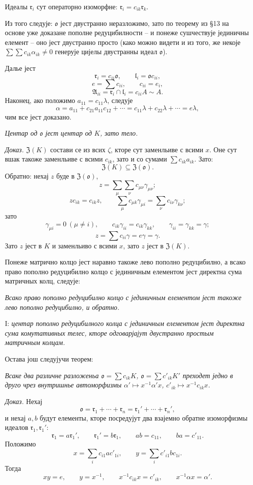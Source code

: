 ﻿\documentclass[11pt]{article}
\providecommand{\mA}{\mathfrak{A}}
\providecommand{\ml}{\mathfrak{l}}
\providecommand{\mo}{\mathfrak{o}}
\providecommand{\mr}{\mathfrak{r}}
\providecommand{\mZ}{\mathfrak{Z}}
\begin{document}
Идеалы $\mr_i$ сут операторно изоморфне: $\mr_i=c_{ik}\mr_k$.

Из того следује: $\mo$ јест двустранно неразложимо, зато по теорему из §13 на основе уже доказане пополне редуцибилности -- и понеже сушчествује јединичны елемент -- оно јест двустранно просто (како можно видети и из того, же некоје $\sum\sum c_{ik}\alpha_{ik}\ne0$ генерује цијелы двустранны идеал $\mo$).

Далье јест
\[
        \mr_i=c_{ii}\mo,
        \qquad
        \ml_i=\mo c_{ii},
\]
\[
        e=\sum c_{ii},
        \qquad c_{ii}=e_i,
\]
\[
        \mA_{ii}=\mr_i\cap\ml_i=c_{ii}A\sim A.
\]
Наконец, ако положимо $a_{11}=c_{11}\lambda$, следује
\[
        \alpha=a_{11}+c_{21}a_{11}c_{12}+\cdots
        =c_{11}\lambda+c_{22}\lambda+\cdots=e\lambda,
\]
чим все јест доказано.

\emph{Центар од $\mo$ јест центар од $K$, зато тело.}

\emph{Доказ.} $\mZ(K)$ состави се из всих $\zeta$, кторе сут заменльиве с всими $x$. Оне сут вшак такоже заменльиве с всими $c_{ik}$, зато и со сумами $\sum c_{ik}a_{ik}$. Зато:
\[
        \mZ(K)\subseteq\mZ(\mo).
\]
Обратно: нехај $z$ буде в $\mZ(\mo)$,
\[
        z=\sum_\mu\sum_\nu c_{\mu\nu}\gamma_{\mu\nu};
\]
\[
        zc_{ik}=c_{ik}z,
        \qquad
        \sum_\mu c_{\mu k}\gamma_{\mu i}=\sum_\nu c_{i\nu}\gamma_{k\nu};
\]
зато
\[
        \gamma_{\mu i}=0\ (\mu\ne i),
        \qquad
        c_{ik}\gamma_{ii}=c_{ik}\gamma_{kk},
        \qquad
        \gamma_{ii}=\gamma_{kk}=\gamma;
\]
\[
        z=\sum c_{ii}\gamma=e\gamma=\gamma.
\]
Зато $z$ јест в $K$ и заменльиво с всими $x$, зато $z$ јест в $\mZ(K)$.

Понеже матрично колцо јест наравно такоже лево пополно редуцибилно, а всако право пополно редуцибилно колцо с јединичным елементом јест директна сума матричных колц, следује:

\emph{Всако право пополно редуцибилно колцо с јединичным елементом јест такоже лево пополно редуцибилно, и обратно.}

I: \emph{центар пополно редуцибилного колца с јединичным елементом јест директна сума комутативных телес, кторе одговарјајут двустранно простым матричным колцам.}

Остава још следујучи теорем:

\emph{Всаке два различне разложеньа $\mo=\sum c_{ik}K$, $\mo=\sum c'_{ik}K'$ преходет једно в друго чрез внутришнье автоморфизмы $\alpha'\mapsto x^{-1}\alpha'x$, $c'_{ik}\mapsto x^{-1}c_{ik}x$.}

\emph{Доказ.} Нехај
\[
        \mo=\mr_1+\cdots+\mr_n=\mr_1'+\cdots+\mr_n',
\]
и нехај $a,b$ будут елементы, кторе посредујут два взајемно обратне изоморфизмы идеалов $\mr_1,\mr_1'$:
\[
        \mr_1=a\mr_1',
        \qquad
        \mr_1'=b\mr_1,
        \qquad
        ab=c_{11},
        \qquad
        ba=c'_{11}.
\]
Положимо
\[
        x=\sum_i c_{i1}ac'_{1i},
        \qquad
        y=\sum_i c'_{i1}bc_{1i}.
\]
Тогда
\[
        xy=e,
        \qquad
        y=x^{-1},
        \qquad
        x^{-1}c_{ik}x=c'_{ik},
        \qquad
        x^{-1}\alpha x=\alpha'.
\]
\end{document}
